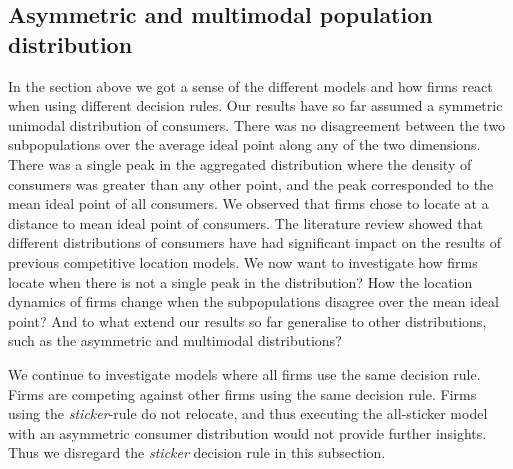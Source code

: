 \documentclass[preprint, 12pt]{elsarticle}
\begin{document}
\subsection{Asymmetric and multimodal population distribution}

In the section above we got a sense of the different models and how firms react when using different decision rules. Our results have so far assumed a symmetric unimodal distribution of consumers. There was no disagreement between the two subpopulations over the average ideal point along any of the two dimensions. There was a single peak in the aggregated distribution where the density of consumers was greater than any other point, and the peak corresponded to the mean ideal point of all consumers. We observed that firms chose to locate at a distance to mean ideal point of consumers. The literature review showed that different distributions of consumers have had significant impact on the results of previous competitive location models. We now want to investigate how firms locate when there is not a single peak in the distribution? How the location dynamics of firms change when the subpopulations disagree over the mean ideal point? And to what extend our results so far generalise to other distributions, such as the asymmetric and multimodal distributions? 

We continue to investigate models where all firms use the same decision rule. Firms are competing against other firms using the same decision rule. Firms using the \emph{sticker}-rule do not relocate, and thus executing the all-sticker model with an asymmetric consumer distribution would not provide further insights. Thus we disregard the \emph{sticker} decision rule in this subsection. 
\end{document}
